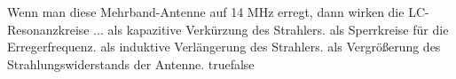     {Wenn man diese Mehrband-Antenne auf 14 MHz erregt, dann wirken die LC-Resonanzkreise ...}
    {als kapazitive Verkürzung des Strahlers.}
    {als Sperrkreise für die Erregerfrequenz.}
    {als induktive Verlängerung des Strahlers.}
    {als Vergrößerung des Strahlungswiderstands der Antenne.}
    {true}{false}